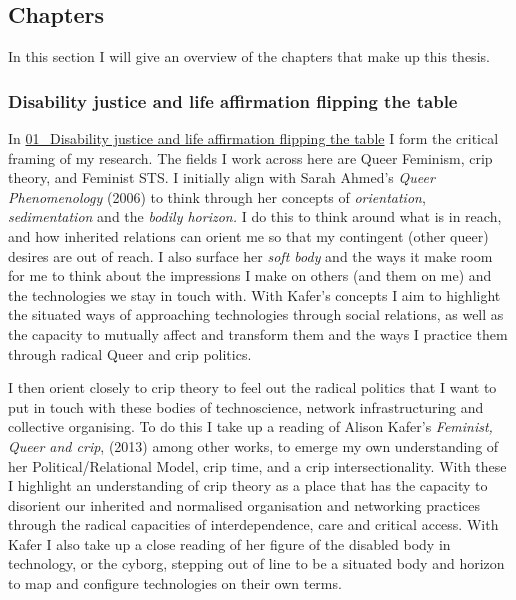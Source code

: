 \hypertarget{chapters}{%
\subsection{Chapters}\label{chapters}}

In this section I will give an overview of the chapters that make up
this thesis.

\hypertarget{disability-justice-and-life-affirmation-flipping-the-table}{%
\subsubsection{Disability justice and life affirmation flipping the
table}\label{disability-justice-and-life-affirmation-flipping-the-table}}

In
\href{../../01_Disability_justice_and_life_affirmation_flipping_the_table/01_Disability\%20justice\%20and\%20life\%20affirmation\%20flipping\%20the\%20table.md}{01\_Disability
justice and life affirmation flipping the table} I form the critical
framing of my research. The fields I work across here are Queer
Feminism, crip theory, and Feminist STS. I initially align with Sarah
Ahmed's \emph{Queer Phenomenology} (2006) to think through her concepts
of \emph{orientation}, \emph{sedimentation} and the \emph{bodily
horizon.} I do this to think around what is in reach, and how inherited
relations can orient me so that my contingent (other queer) desires are
out of reach. I also surface her \emph{soft body} and the ways it make
room for me to think about the impressions I make on others (and them on
me) and the technologies we stay in touch with. With Kafer's concepts I
aim to highlight the situated ways of approaching technologies through
social relations, as well as the capacity to mutually affect and
transform them and the ways I practice them through radical Queer and
crip politics.

I then orient closely to crip theory to feel out the radical politics
that I want to put in touch with these bodies of technoscience, network
infrastructuring and collective organising. To do this I take up a
reading of Alison Kafer's \emph{Feminist, Queer and crip}, (2013) among
other works, to emerge my own understanding of her Political/Relational
Model, crip time, and a crip intersectionality. With these I highlight
an understanding of crip theory as a place that has the capacity to
disorient our inherited and normalised organisation and networking
practices through the radical capacities of interdependence, care and
critical access. With Kafer I also take up a close reading of her figure
of the disabled body in technology, or the cyborg, stepping out of line
to be a situated body and horizon to map and configure technologies on
their own terms.

